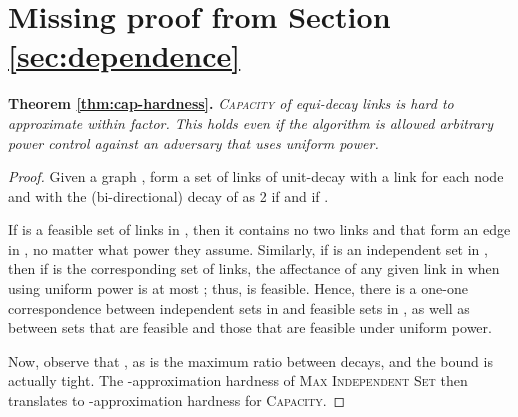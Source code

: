 \documentclass[11pt]{amsart}
\newcommand{\prob}[1]{\textsc{#1}}
\newcommand{\Capacity}{\prob{Capacity}}
\newcommand{\capacity}{\Capacity}
\begin{document}
\iffalse We have proposed a model that captures spatial variability of wireless signals.
The approach is generic enough that most algorithmic techniques for the geometric SINR model carry over with minimal adaptation. 

There are three immediate open questions that our results raise:
Can we further reduce the gap in the approximation in terms of the smoothness parameter? Can we extend our approach to the case, commonly required by distributed algorithms, where we need a \emph{lower} bound on decay and smoothness?
And, can we extend the graph-based approach we applied to connectivity to Steiner-problems or directed graphs?

It is also important to point out that our model does not attempt to cover all the challenging aspects of wireless networks. For one, it is \emph{static} and does not capture dynamicity or temporal variability; this is a very challenging but important aspect. And second, it is \emph{deterministic}; success or failure in wireless networks does have a probabilistic aspect. The work of \cite{Dams2012} suggests that deterministic approximation algorithms perform well if probabilities are independent on a wide scale; the challenge is in modeling the likely dependence, both spatially and temporally. Handling these issues is an interesting and challenging open research direction. 
\fi

\newpage




\appendix

\section{Missing proof from Section \ref{sec:dependence}}

\noindent \textbf{Theorem \ref{thm:cap-hardness}.} \emph{
\prob{Capacity} of equi-decay links is hard to approximate within  factor.
This holds even if the algorithm is allowed 
arbitrary power control against an adversary that uses uniform power.
}

\begin{proof}
Given a graph , form a set  of links of unit-decay with a
link  for each node  and with the (bi-directional) decay of
 as 2 if  and  if .

If  is a feasible set of links in , then it contains no two
links  and  that form an edge in , no matter what
power they assume.  Similarly, if  is an independent set in ,
then if  is the corresponding set of links, the affectance of any
given link  in  when using uniform power is at most ; thus,  is feasible.  Hence, there is a one-one
correspondence between independent sets in  and feasible sets in
, as well as between sets that are feasible and those that are feasible
under uniform power.

Now, observe that , as  is the maximum ratio
between decays, and the bound is actually tight.  The
-approximation hardness of \prob{Max Independent Set}
\cite{khot2006better} then translates to -approximation hardness for {\capacity}.
\end{proof}
\end{document}
